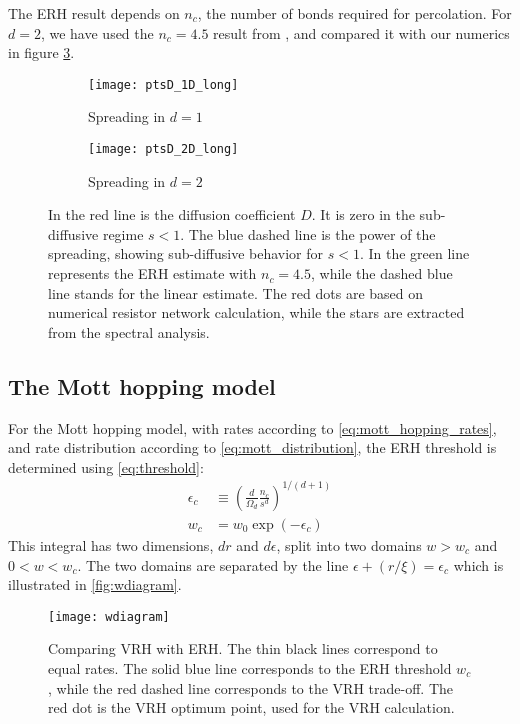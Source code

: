 The ERH result depends on $n_c$, the number of bonds 
required for percolation.
For $d=2$, we have used the $n_c=4.5$ result from \cite{dalton_dependence_1964,*pike_percolation_1974}, 
and compared it with our numerics in figure \ref{fig:spread_2d}.

\begin{figure}
\begin{subfigure}{0.4\textwidth}
\texttt{[image: ptsD\_1D\_long]}
\caption{Spreading in $d{=}1$}
\label{fig:spread_1d}
\end{subfigure}
\begin{subfigure}{0.48\textwidth}
\texttt{[image: ptsD\_2D\_long]}
\caption{Spreading in $d{=}2$}
\label{fig:spread_2d}
\end{subfigure}
\caption{In  the red line is the diffusion coefficient $D$. It is zero in the sub-diffusive regime $s<1$. 
The blue dashed line is the power of the spreading, showing sub-diffusive behavior for $s<1$.
In  the green line represents the ERH estimate with $n_c=4.5$, while the dashed blue line stands for
the linear estimate. The red dots are based on numerical resistor network calculation, while the stars are extracted from the
spectral analysis. }
\end{figure}



\subsection{The Mott hopping model}

For the Mott hopping model, with rates according to \autoref{eq:mott_hopping_rates},
and rate distribution according to \autoref{eq:mott_distribution}, the ERH 
threshold is determined using \autoref{eq:threshold}:
%
\begin{align}
\epsilon_c &\equiv \left( \frac{d}{\Omega_d} \frac{n_c}{s^d} \right)^{1/(d+1)} \\
w_c &= w_0\exp(-\epsilon_c) 
\end{align}
%
This integral has two dimensions, $dr$ and $d\epsilon$,
split into two domains 
${w>w_c}$ and ${0<w<w_c}$. The two domains are 
separated by the line ${\epsilon+(r/\xi)=\epsilon_c}$ which is illustrated in \autoref{fig:wdiagram}.

\begin{figure}
\texttt{[image: wdiagram]}
\caption[VRH vs ERH]{Comparing VRH with ERH. The thin black lines 
correspond to equal rates. The solid blue line corresponds to the
ERH threshold $w_c$, while the red dashed line corresponds to the
VRH trade-off. The red dot is the VRH optimum point, used for the
VRH calculation.}
\label{fig:wdiagram}
\end{figure}


